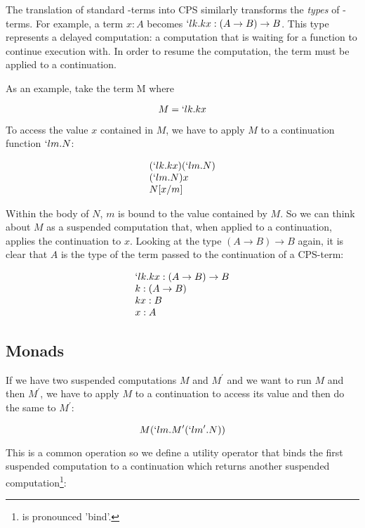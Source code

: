   The translation of standard \lam-terms into CPS similarly transforms the 
  \emph{types} of \lam-terms. For example, a term $x : A$ becomes 
  $`lk.kx : (A \to B) \to B$. This type represents a delayed computation:
  a computation that is waiting for a function to continue execution with. 
  In order to resume the computation, the term must be applied to a 
  continuation.
  
  As an example, take the term M where
  
  \[
    M = `lk.kx
  \]

  To access the value $x$ contained in $M$, we have to apply $M$ to a
  continuation function $`lm.N$:
  
  \[
  \begin{array}{l}
      (`lk.kx)(`lm.N) \\
      (`lm.N)x \\
      N[x/m]
  \end{array}
  \]
  
  Within the body of $N$, $m$ is bound to the value contained by $M$.
  So we can think about $M$ as a suspended computation that, when applied
  to a continuation, applies the continuation to $x$. Looking at
  the type $(A \to B) \to B$ again, it is clear that $A$ is the type
  of the term passed to the continuation of a CPS-term:
  
  \[
  \begin{array}{l}
    `lk.kx : (A \to B) \to B \\
    k : (A \to B) \\
    kx : B \\
    x : A \\
  \end{array} 
  \]
  
 
  \subsection{Monads}
  
  If we have two suspended computations $M$ and $M^\prime$ and we want to
  run $M$ and then $M^\prime$, we have to apply $M$ to a continuation
  to access its value and then do the same to $M^\prime$:
  
  \[
    M(`lm.M^\prime(`lm^\prime.N))
  \]
  
  This is a common operation so we define a utility operator \mono{>>=}
  that binds the first suspended computation to a continuation which 
  returns another suspended computation\footnote{ \mono{(>>=)} is pronounced 'bind'.}:
 
